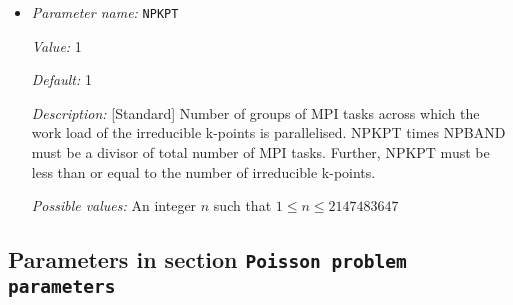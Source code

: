 \begin{itemize}
{\it Possible values:} An integer $n$ such that $1\leq n \leq 2147483647$
\item {\it Parameter name:} {\tt NPKPT}
\label{parameters:Parallelization/NPKPT}


{\it Value:} 1


{\it Default:} 1


{\it Description:} [Standard] Number of groups of MPI tasks across which the work load of the irreducible k-points is parallelised. NPKPT times NPBAND must be a divisor of total number of MPI tasks. Further, NPKPT must be less than or equal to the number of irreducible k-points.


{\it Possible values:} An integer $n$ such that $1\leq n \leq 2147483647$
\end{itemize}

\subsection{Parameters in section \tt Poisson problem parameters}
\label{parameters:Poisson_20problem_20parameters}

